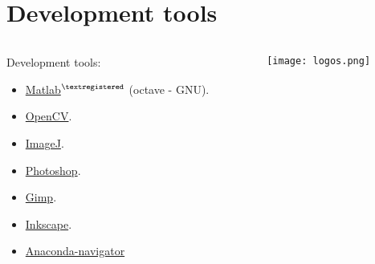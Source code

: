 %
%


\section{Development tools}


\begin{frame}
\begin{columns}
\begin{column}{.5\textwidth}
Development tools:
\begin{itemize}
\item \href{http://www.mathworks.com/products/matlab/}{Matlab$^{\textregistered}$} (octave - GNU).
\item \href{http://opencv.org/}{OpenCV}.
\item \href{http://imagej.nih.gov/ij/}{ImageJ}.
\item \href{http://www.photoshop.com/}{Photoshop}.
\item \href{http://www.gimp.org/}{Gimp}.
\item \href{https://inkscape.org/en/}{Inkscape}.
\item \href{https://docs.anaconda.com/anaconda/navigator/}{Anaconda-navigator}
\end{itemize}
\end{column}
\begin{column}{.5\textwidth}
\begin{figure}
\texttt{[image: logos.png]}
\end{figure}
\end{column}
\end{columns}
\end{frame}

